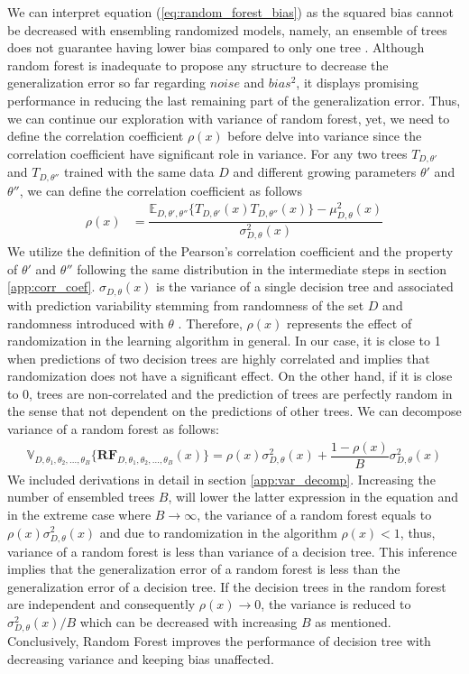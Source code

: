 We can interpret equation (\ref{eq:random_forest_bias}) as the squared bias cannot be decreased with ensembling randomized models, 
namely, an ensemble of trees does not guarantee having lower bias compared to only one tree \cite{friedman2001elements}.
Although random forest is inadequate to propose any structure to decrease the generalization error so far regarding $noise$ 
and $bias^2$, it displays promising performance in reducing the last remaining part of the generalization error. 
Thus, we can continue our exploration with variance of random forest, yet, we need to define the correlation coefficient $\rho(x)$
before delve into variance since the correlation coefficient have significant role in variance. 
For any two trees $T_{D,\theta'}$ and $T_{D,\theta''}$ trained with the same data $D$
and different growing parameters $\theta'$ and $\theta''$, we can define the correlation coefficient as follows
\begin{align}
	\rho(x) & 
	= \dfrac{\mathbb{E}_{D,\theta',\theta''}\{T_{D,\theta'}(x) T_{D,\theta''}(x)\} 
	- \mu_{D,\theta}^2(x)}{\sigma_{D,\theta}^2(x)}
\end{align}
We utilize the definition of the Pearson's correlation coefficient and the property of $\theta'$ and $\theta''$ following 
the same distribution in the intermediate steps in section \ref{app:corr_coef}. 
$\sigma_{D, \theta}(x)$ is the variance of a single decision tree and 
associated with prediction variability stemming from randomness of the set $D$ 
and randomness introduced with $\theta$ \cite{louppe2014understanding}.
Therefore, $\rho(x)$ represents the effect of randomization in the learning algorithm in general.
In our case, it is close to 1 when predictions of two decision trees are highly correlated and implies that randomization 
does not have a significant effect. 
On the other hand, if it is close to 0, trees are non-correlated and 
the prediction of trees are perfectly random in the sense that 
not dependent on the predictions of other trees. 
We can decompose variance of a random forest as follows:
\begin{align}\label{eq:decomp_var}
\mathbb{V}_{D, \theta_{1}, \theta_{2},..., \theta_{B}}\{\boldsymbol{RF}_{D, \theta_{1},\theta_{2},..., \theta_{B}}(x) \}  = \rho(x)\sigma^2_{D,\theta}(x) + \dfrac{1-\rho(x)}{B}\sigma^2_{D,\theta}(x)
\end{align}
We included derivations in detail in section \ref{app:var_decomp}. 
Increasing the number of ensembled trees $B$, will lower the latter expression in the equation and in the extreme 
case where $B \rightarrow \infty $, the variance of a random forest equals to $\rho(x)\sigma^2_{D,\theta}(x)$ 
and due to randomization in the algorithm $\rho(x) < 1$, 
thus, variance of a random forest is less than variance of a decision tree. 
This inference implies that the generalization error of a random forest is less than the generalization error of a decision tree. 
If the decision trees in the random forest are independent 
and consequently $\rho(x) \rightarrow 0$, the variance is reduced to $\sigma^2_{D,\theta}(x)/B$ 
which can be decreased with increasing $B$ as mentioned. 
Conclusively, Random Forest improves the performance of decision tree with decreasing variance and keeping bias unaffected.

